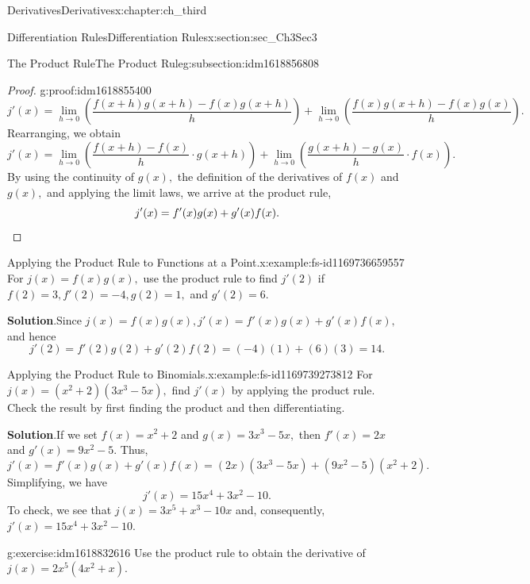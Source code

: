 \documentclass[oneside,10pt,]{book}
\newcommand{\blocktitlefont}{\relax}
\numberwithin{equation}{section}
\newcommand{\qedhere}{\relax}
\begin{document}
\begin{chapterptx}{Derivatives}{}{Derivatives}{}{}{x:chapter:ch_third}
\begin{sectionptx}{Differentiation Rules}{}{Differentiation Rules}{}{}{x:section:sec_Ch3Sec3}
\begin{subsectionptx}{The Product Rule}{}{The Product Rule}{}{}{g:subsection:idm1618856808}
\begin{proof}{}{g:proof:idm1618855400}
\begin{equation*}
j'(x)=\lim_{h\to 0}(\frac{f(x+h)g(x+h)-f(x)g(x+h)}{h})+\lim_{h\to 0}(\frac{f(x)g(x+h)-f(x)g(x)}{h}).
\end{equation*}
Rearranging, we obtain%
%
\begin{equation*}
j'(x)=\lim_{h\to 0}(\frac{f(x+h)-f(x)}{h}\cdot g(x+h))+\lim_{h\to 0}(\frac{g(x+h)-g(x)}{h}\cdot f(x)).
\end{equation*}
By using the continuity of \(g(x),\) the definition of the derivatives of \(f(x)\) and \(g(x),\) and applying the limit laws, we arrive at the product rule,%
%
\begin{equation*}
j'(x)=f'(x)g(x)+g'(x)f(x).\qedhere
\end{equation*}
\end{proof}
\begin{example}{Applying the Product Rule to Functions at a Point.}{x:example:fs-id1169736659557}%
For \(j(x)=f(x)g(x),\) use the product rule to find \(j'(2)\) if \(f(2)=3,f'(2)=-4,g(2)=1,\) and \(g'(2)=6.\)%
\par\smallskip%
\noindent\textbf{\blocktitlefont Solution}.\hypertarget{g:solution:idm1618842600}{}\quad{}Since \(j(x)=f(x)g(x),j'(x)=f'(x)g(x)+g'(x)f(x),\) and hence%
%
\begin{equation*}
j'(2)=f'(2)g(2)+g'(2)f(2)=(-4)(1)+(6)(3)=14.
\end{equation*}
\end{example}
\begin{example}{Applying the Product Rule to Binomials.}{x:example:fs-id1169739273812}%
For \(j(x)=(x^2+2)(3x^3-5x),\) find \(j'(x)\) by applying the product rule. Check the result by first finding the product and then differentiating.%
\par\smallskip%
\noindent\textbf{\blocktitlefont Solution}.\hypertarget{g:solution:idm1618838376}{}\quad{}If we set \(f(x)=x^2+2\) and \(g(x)=3x^3-5x,\) then \(f'(x)=2x\) and \(g'(x)=9x^2-5.\) Thus,%
%
\begin{equation*}
j'(x)=f'(x)g(x)+g'(x)f(x)=(2x)(3x^3-5x)+(9x^2-5)(x^2+2).
\end{equation*}
Simplifying, we have%
%
\begin{equation*}
j'(x)=15x^4+3x^2-10.
\end{equation*}
To check, we see that \(j(x)=3x^5+x^3-10x\) and, consequently, \(j'(x)=15x^4+3x^2-10.\)%
\end{example}
\begin{inlineexercise}{}{g:exercise:idm1618832616}%
Use the product rule to obtain the derivative of \(j(x)=2x^5(4x^2+x).\)%
\par\smallskip%

\end{inlineexercise}
\end{subsectionptx}
\end{sectionptx}
\end{chapterptx}
\end{document}
